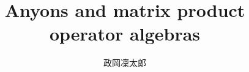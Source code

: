 \documentclass[12pt]{ltjsarticle}
\newcommand{\∩}[1]{
  \vcenter{\hbox{\scriptsize$#1$}}
}
\numberwithin{equation}{section}
\begin{document}
\title{Anyons and matrix product operator  algebras}
\author{政岡凜太郎}
\maketitle

\tableofcontents
\newpage

\newpage

\newpage

\newpage

% 
\newpage
\appendix
\def\thesection{\Alph{section}}

\newpage
\printbibliography
\end{document}
